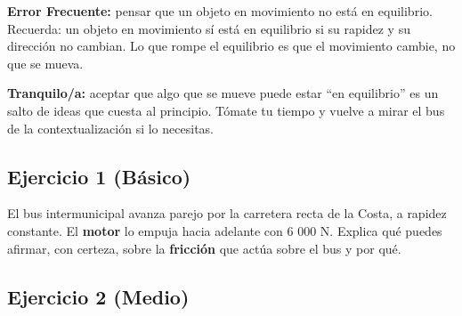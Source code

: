\documentclass[
  spanish,
  letterpaper,
  12pt,
  oneside,
  open=any,
  DIV=15]{scrbook}
\begin{document}
\begin{tcolorbox}[enhanced jigsaw, arc=.35mm, bottomrule=.15mm, bottomtitle=1mm, breakable, colback=white, colbacktitle=quarto-callout-caution-color!10!white, colframe=quarto-callout-caution-color-frame, coltitle=black, left=2mm, leftrule=.75mm, opacityback=0, opacitybacktitle=0.6, rightrule=.15mm, title=\textcolor{quarto-callout-caution-color}{\faFire}\hspace{0.5em}{Prevención de Errores (Cuidado)}, titlerule=0mm, toprule=.15mm, toptitle=1mm]

\textbf{Error Frecuente:} pensar que un objeto en movimiento no está en
equilibrio. Recuerda: un objeto en movimiento sí está en equilibrio si
su rapidez y su dirección no cambian. Lo que rompe el equilibrio es que
el movimiento cambie, no que se mueva.

\end{tcolorbox}

\begin{tcolorbox}[enhanced jigsaw, arc=.35mm, bottomrule=.15mm, bottomtitle=1mm, breakable, colback=white, colbacktitle=quarto-callout-note-color!10!white, colframe=quarto-callout-note-color-frame, coltitle=black, left=2mm, leftrule=.75mm, opacityback=0, opacitybacktitle=0.6, rightrule=.15mm, title=\textcolor{quarto-callout-note-color}{\faInfo}\hspace{0.5em}{Apoyo Socioemocional}, titlerule=0mm, toprule=.15mm, toptitle=1mm]

\textbf{Tranquilo/a:} aceptar que algo que se mueve puede estar ``en
equilibrio'' es un salto de ideas que cuesta al principio. Tómate tu
tiempo y vuelve a mirar el bus de la contextualización si lo necesitas.

\end{tcolorbox}

\subsection{Ejercicio 1 (Básico)}\label{ejercicio-1-buxe1sico-5}

El bus intermunicipal avanza parejo por la carretera recta de la Costa,
a rapidez constante. El \textcolor[HTML]{7C3AED}{\textbf{motor}} lo
empuja hacia adelante con 6 000 N. Explica qué puedes afirmar, con
certeza, sobre la \textcolor[HTML]{2563EB}{\textbf{fricción}} que actúa
sobre el bus y por qué.

\subsection{Ejercicio 2 (Medio)}\label{ejercicio-2-medio-5}
\end{document}
